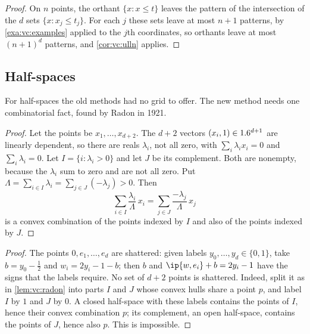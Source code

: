 \begin{refsection}
\begin{proof}
On $n$ points, the orthant $\{x: x\le t\}$ leaves the pattern of the intersection of the $d$ sets $\{x: x_j\le t_j\}$. For each $j$ these sets leave at most $n+1$ patterns, by \cref{exa:vc:examples} applied to the $j$th coordinates, so orthants leave at most $(n+1)^d$ patterns, and \cref{cor:vc:ulln} applies.
\end{proof}

\subsection{Half-spaces}\label{sec:vc:halfspaces}

For half-spaces the old methods had no grid to offer. The new method needs one combinatorial fact, found by Radon in 1921.


\begin{proof}
Let the points be $x_1,\dots,x_{d+2}$. The $d+2$ vectors $(x_i,1)\in1.6^{d+1}$ are linearly dependent, so there are reals $\lambda_i$, not all zero, with $\sum_i\lambda_ix_i = 0$ and $\sum_i\lambda_i = 0$. Let $I = \{i:\lambda_i>0\}$ and let $J$ be its complement. Both are nonempty, because the $\lambda_i$ sum to zero and are not all zero. Put $\Lambda = \sum_{i\in I}\lambda_i = \sum_{j\in J}(-\lambda_j)>0$. Then
\[
  \sum_{i\in I}\frac{\lambda_i}{\Lambda}\,x_i = \sum_{j\in J}\frac{-\lambda_j}{\Lambda}\,x_j
\]
is a convex combination of the points indexed by $I$ and also of the points indexed by $J$.
\end{proof}


\begin{proof}
The points $0,e_1,\dots,e_d$ are shattered: given labels $y_0,\dots,y_d\in\{0,1\}$, take $b = y_0-\frac12$ and $w_i = 2y_i-1-b$; then $b$ and $\ip{w,e_i}+b = 2y_i-1$ have the signs that the labels require. No set of $d+2$ points is shattered. Indeed, split it as in \cref{lem:vc:radon} into parts $I$ and $J$ whose convex hulls share a point $p$, and label $I$ by $1$ and $J$ by $0$. A closed half-space with these labels contains the points of $I$, hence their convex combination $p$; its complement, an open half-space, contains the points of $J$, hence also $p$. This is impossible.
\end{proof}


\end{refsection}
